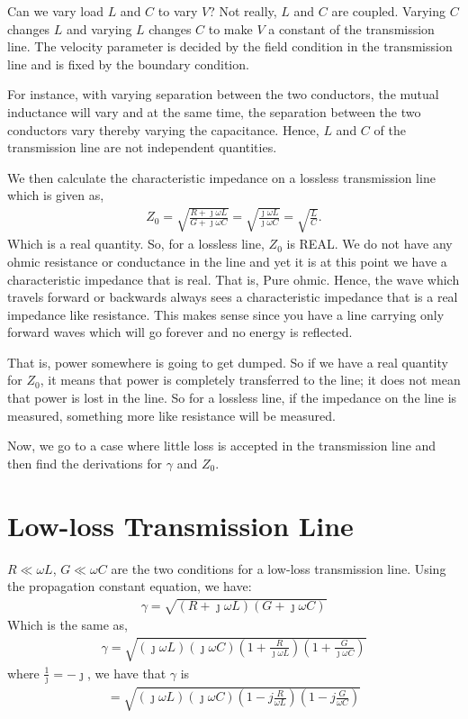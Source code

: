Can we vary load $L$ and $C$ to vary $V$? Not really, $L$ and $C$ are coupled. Varying $C$ changes $L$ and varying $L$ changes $C$ to make $V$ a constant of the transmission line. The velocity parameter is decided by the field condition in the transmission line and is fixed by the boundary condition. 

For instance, with varying separation between the two conductors, the mutual inductance will vary and at the same time, the separation between the two conductors vary thereby varying the capacitance. Hence, $L$ and $C$ of the transmission line are not independent quantities.

We then calculate the characteristic impedance on a lossless transmission line which is given as,
\begin{align*}
Z_0 = \sqrt{\frac{R + \jmath\omega L}{G + \jmath\omega C}} = \sqrt{\frac{\jmath\omega L}{\jmath\omega C}} = \sqrt{\frac{L}{C}}.
\end{align*}
Which is a real quantity. So, for a lossless line, $Z_0$ is REAL. We do not have any ohmic resistance or conductance in the line and yet it is at this point we have a characteristic impedance that is real. That is, Pure ohmic. Hence, the wave which travels forward or backwards always sees a characteristic impedance that is a real impedance like resistance. This makes sense since you have a line carrying only forward waves which will go forever and no energy is reflected. 

That is, power somewhere is going to get dumped. So if we have a real quantity for $Z_0$, it means that power is completely transferred to the line; it does not mean that power is lost in the line. So for a lossless line, if the impedance on the line is measured, something more like resistance will be measured.

Now, we go to a case where little loss is accepted in the transmission line and then find the derivations for $\gamma$ and $Z_0$.
\section{Low-loss Transmission Line}
$R \ll \omega L$, $G \ll \omega C$ are the two conditions for a low-loss transmission line. Using the propagation constant equation, we have:
\begin{align*}
\gamma = \sqrt{(R + \jmath\omega L)(G + \jmath\omega C)}
\end{align*}
Which is the same as,
\begin{align*}
\gamma = \sqrt{{(\jmath\omega L)(\jmath\omega C)(1 + \frac{R}{\jmath\omega L})(1 + \frac{G}{\jmath\omega C})}}
\end{align*}
where $\frac{1}{\jmath} = -\jmath$, we have that $\gamma$ is
\begin{align}
= \sqrt{{(\jmath\omega L)(\jmath\omega C)(1 - j\frac{R}{\omega L})(1 - j\frac{G}{\omega C})}}
\label{eqn:lowlossgamma}
\end{align}

